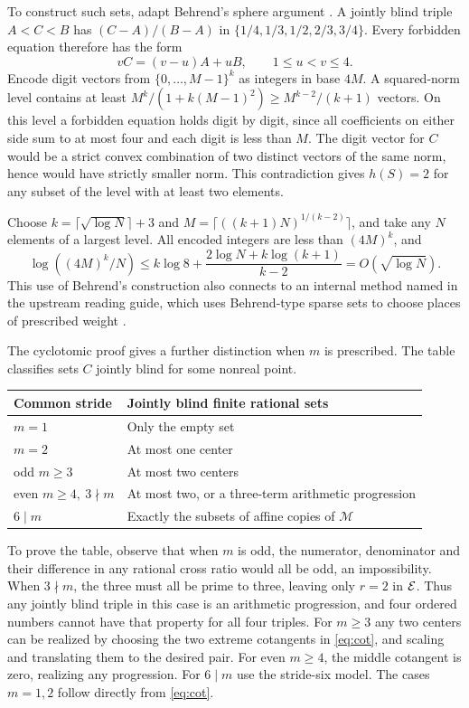 \documentclass[11pt,letterpaper]{article}
\newcommand{\M}{\mathcal M}
\newcommand{\heading}[1]{\medskip\noindent{\large\bfseries\color{ink}#1}\par}
\begin{document}
To construct such sets, adapt Behrend's sphere argument \cite{Behrend}. A jointly blind triple \(A<C<B\) has \((C-A)/(B-A)\) in \(\{1/4,1/3,1/2,2/3,3/4\}\). Every forbidden equation therefore has the form
\[
       vC=(v-u)A+uB,\qquad 1\le u<v\le4 .
\]
Encode digit vectors from \(\{0,\ldots,M-1\}^k\) as integers in base \(4M\). A squared-norm level contains at least
\(M^k/(1+k(M-1)^2)\ge M^{k-2}/(k+1)\) vectors. On this level a forbidden equation holds digit by digit, since all coefficients on either side sum to at most four and each digit is less than \(M\). The digit vector for \(C\) would be a strict convex combination of two distinct vectors of the same norm, hence would have strictly smaller norm. This contradiction gives \(h(S)=2\) for any subset of the level with at least two elements.

Choose \(k=\lceil\sqrt{\log N}\rceil+3\) and \(M=\lceil((k+1)N)^{1/(k-2)}\rceil\), and take any \(N\) elements of a largest level. All encoded integers are less than \((4M)^k\), and
\[
 \log((4M)^k/N)\le k\log 8+
        \frac{2\log N+k\log(k+1)}{k-2}=O(\sqrt{\log N}).
\]
This use of Behrend's construction also connects to an internal method named in the upstream reading guide, which uses Behrend-type sparse sets to choose places of prescribed weight \cite{grh}.

\newpage
\heading{7. Prescribed strides and Dirichlet functions}

The cyclotomic proof gives a further distinction when \(m\) is prescribed. The table classifies sets \(C\) jointly blind for some nonreal point.
\begin{center}\small
\begin{tabular}{@{}ll@{}}\toprule
Common stride & Jointly blind finite rational sets\\ \midrule
\(m=1\) & Only the empty set\\
\(m=2\) & At most one center\\
odd \(m\ge3\) & At most two centers\\
even \(m\ge4,\ 3\nmid m\) & At most two, or a three-term arithmetic progression\\
\(6\mid m\) & Exactly the subsets of affine copies of \(\M\)\\ \bottomrule
\end{tabular}
\end{center}

To prove the table, observe that when \(m\) is odd, the numerator, denominator and their difference in any rational cross ratio would all be odd, an impossibility. When \(3\nmid m\), the three must all be prime to three, leaving only \(r=2\) in \(\mathcal E\). Thus any jointly blind triple in this case is an arithmetic progression, and four ordered numbers cannot have that property for all four triples. For \(m\ge3\) any two centers can be realized by choosing the two extreme cotangents in \eqref{eq:cot}, and scaling and translating them to the desired pair. For even \(m\ge4\), the middle cotangent is zero, realizing any progression. For \(6\mid m\) use the stride-six model. The cases \(m=1,2\) follow directly from \eqref{eq:cot}.
\end{document}
